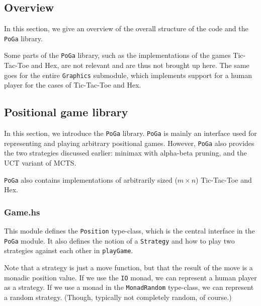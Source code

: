 \subsection {Overview}

In this section, we give an overview of the overall structure of the code and the \texttt{PoGa} library.


Some parts of the \texttt{PoGa} library, such as the implementations of the games Tic-Tac-Toe and Hex, are not relevant and are thus not brought up here.
The same goes for the entire \texttt{Graphics} submodule, which implements support for a human player for the cases of Tic-Tac-Toe and Hex.

\subsection {Positional game library}

In this section, we introduce the \texttt{PoGa} library.
\texttt{PoGa} is mainly an interface used for representing and playing arbitrary positional games.
However, \texttt{PoGa} also provides the two strategies discussed earlier: minimax with alpha-beta pruning, and the UCT variant of MCTS.

\texttt{PoGa} also contains implementations of arbitrarily sized ($m \times n$) Tic-Tac-Toe and Hex.

\subsubsection {Game.hs}

This module defines the \texttt{Position} type-class, which is the central interface in the \texttt{PoGa} module.
It also defines the notion of a \texttt{Strategy} and how to play two strategies against each other in \texttt{playGame}.

Note that a strategy is just a move function, but that the result of the move is a monadic position value.
If we use the \texttt{IO} monad, we can represent a human player as a strategy. If we use a monad in the \texttt{MonadRandom} type-class, we can represent a random strategy. (Though, typically not completely random, of course.)

